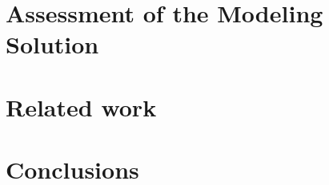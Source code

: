 \documentclass[american]{emisa}
\begin{document}
\begin{article}
\section{Assessment of the Modeling Solution}
\label{sec:discussion}


\section{Related work}
\label{sec:relatedwork}


\section{Conclusions}
\label{sec:conclusions}


\printbibliography

\end{article}
\end{document}
